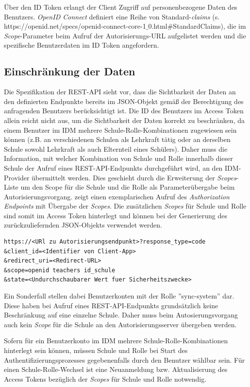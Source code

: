 Über den ID Token erlangt der Client Zugriff auf personenbezogene Daten des Benutzers. 
\textit{OpenID Connect} definiert eine Reihe von Standard-\textit{claims} (s. https://openid.net/specs/openid-connect-core-1$\_$0.html\#StandardClaims), die im \textit{Scope}-Parameter beim Aufruf der Autorisierungs-URL aufgelistet werden und die spezifische Benutzerdaten im ID Token angefordern.

\subsection{Einschränkung der Daten}
\label{auth:limit_data}

Die Spezifikation der REST-API sieht vor, dass die Sichtbarkeit der Daten an den definierten Endpunkte bereits im JSON-Objekt gemäß der Berechtigung des anfragenden Benutzers berücksichtigt ist. 
Die ID des Benutzers im Access Token allein reicht nicht aus, um die Sichtbarkeit der Daten korrekt zu beschränken, da einem Benutzer im IDM mehrere Schule-Rolle-Kombinationen zugewiesen sein können (z.B. an verschiedenen Schulen als Lehrkraft tätig oder an derselben Schule sowohl Lehrkraft als auch Elternteil eines Schülers). 
Daher muss die Information, mit welcher Kombination von Schule und Rolle innerhalb dieser Schule der Aufruf eines REST-API-Endpunkts durchgeführt wird, an den IDM-Provider übermittelt werden. 
Dies geschieht durch die Erweiterung der \textit{Scopes}-Liste um den Scope für die Schule und die Rolle als Parameterübergabe beim Autorisierungsvorgang. 
 zeigt einen exemplarischen Aufruf des \textit{Authorization Endpoints} mit Übergabe der \textit{Scopes}.
Die zusätzlichen \textit{Scopes} für Schule und Rolle sind somit im Access Token hinterlegt und können bei der Generierung des zurückzuliefernden JSON-Objekts verwendet werden.

\begin{lstlisting}[caption={Beispielhafter Aufruf des Authorization Endpoints},label={listing:authorization_request},frame=tlrb]
https://<URl zu Autorisierungsendpunkt>?response_type=code
&client_id=<Identifier von Client-App>
&redirect_uri=<Redirect-URL>
&scope=openid teachers id_schule
&state=<Undurchschaubarer Wert fuer Sicherheitszwecke>
\end{lstlisting}

Ein Sonderfall stellen dabei Benutzerkonten mit der Rolle ''sync-system'' dar. 
Diese haben bei Aufruf eines REST-API-Endpunkts grundsätzlich keine Beschränkung auf eine einzelne Schule. 
Daher muss beim Autosierungsvorgang auch kein \textit{Scope} für die Schule an den Autorisierungsserver übergeben werden.

Sofern für ein Benutzerkonto im IDM mehrere Schule-Rolle-Kombinationen hinterlegt sein können, müssen Schule und Rolle bei Start des Authentifizierungsprozesses gegebenenfalls durch den Benutzer wählbar sein. 
Für einen Schule-Rolle-Wechsel ist eine Neuanmeldung bzw. Aktualisierung des Access Tokens bezüglich der \textit{Scopes} für Schule und Rolle notwendig.